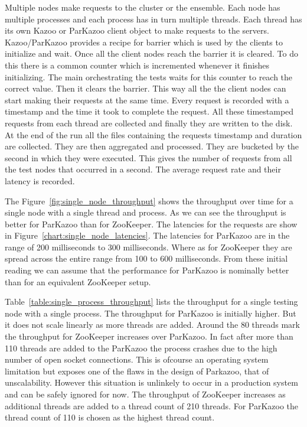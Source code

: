 Multiple nodes make requests to the cluster or the ensemble. Each node has multiple processes and each process has in turn multiple threads. Each thread has its own Kazoo or ParKazoo client object to make requests to the servers. Kazoo/ParKazoo provides a recipe for barrier which is used by the clients to initialize and wait. Once all the client nodes reach the barrier it is cleared. To do this there is a common counter which is incremented whenever it finishes initializing. The main orchestrating the tests waits for this counter to reach the correct value. Then it clears the barrier. This way all the the client nodes can start making their requests at the same time. Every request is recorded with a timestamp and the time it took to complete the request. All these timestamped requests from each thread are collected and finally they are written to the disk. At the end of the run all the files containing the requests timestamp and duration are collected. They are then aggregated and processed. They are bucketed by the second in which they were executed. This gives the number of requests from all the test nodes that occurred in a second. The average request rate and their latency is recorded. 





The Figure~\ref{fig:single_node_throughput} shows the throughput over time for a single node with a single thread and process. As we can see the throughput is better for ParKazoo than for ZooKeeper. The latencies for the requests are show in Figure~\ref{chart:single_node_latencies}. The latencies for ParKazoo are in the range of 200 milliseconds to 300 milliseconds. Where as for ZooKeeper they are spread across the entire range from 100 to 600 milliseconds. From these initial reading we can assume that the performance for ParKazoo is nominally better than for an equivalent ZooKeeper setup.



Table~\ref{table:single_process_throughput} lists the throughput for a single testing node with a single process. The throughput for ParKazoo is initially higher. But it does not scale linearly as more threads are added. Around the 80 threads mark the throughput for ZooKeeper increases over ParKazoo. In fact after more than 110 threads are added to the ParKazoo the process crashes due to the high number of open socket connections. This is ofcourse an operating system limitation but exposes one of the flaws in the design of Parkazoo, that of unscalability. However this situation is unlinkely to occur in a production system and can be safely ignored for now. The throughput of ZooKeeper increases as additional threads are added to a thread count of 210 threads. For ParKazoo the thread count of 110 is chosen as the highest thread count.

